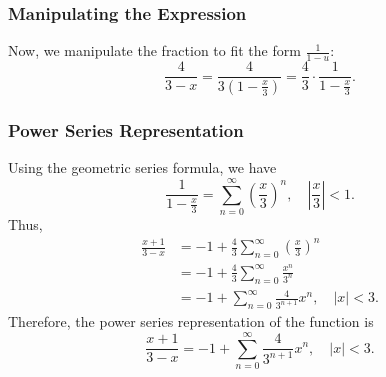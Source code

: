 \subsubsection{Manipulating the Expression}
Now, we manipulate the fraction to fit the form \(\frac{1}{1 - u}\):
\[
\frac{4}{3 - x} = \frac{4}{3(1 - \frac{x}{3})} = \frac{4}{3} \cdot \frac{1}{1 - \frac{x}{3}}.
\]

\subsubsection{Power Series Representation}
Using the geometric series formula, we have
\[
\frac{1}{1 - \frac{x}{3}} = \sum_{n=0}^{\infty} \left( \frac{x}{3} \right)^n, \quad \left| \frac{x}{3} \right| < 1.
\]
Thus,
\begin{align*}
\frac{x + 1}{3 - x} &= -1 + \frac{4}{3} \sum_{n=0}^{\infty} \left( \frac{x}{3} \right)^n \\
&= -1 + \frac{4}{3} \sum_{n=0}^{\infty} \frac{x^n}{3^n} \\
&= -1 + \sum_{n=0}^{\infty} \frac{4}{3^{n+1}} x^n, \quad |x| < 3.
\end{align*}
Therefore, the power series representation of the function is
\[
\frac{x + 1}{3 - x} = -1 + \sum_{n=0}^{\infty} \frac{4}{3^{n+1}} x^n, \quad |x| < 3.
\]
